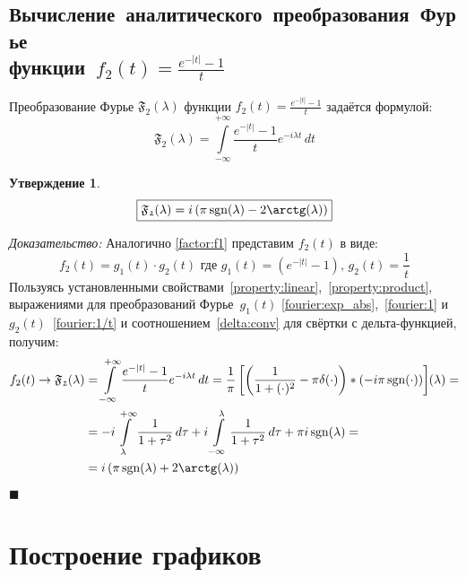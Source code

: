 \documentclass[11pt, oneside, final]{article}
\numberwithin{equation}{section}
\newtheorem*{statement}{Утверждение}
\renewenvironment{proof}{
\noindent\textit{Доказательство: }} {\qed}
\newcommand \rarrow{\rightarrow}
\newcommand \intinf[1][{\,dt}]{ \int\limits_{-\infty}^{+\infty}{{#1}}}
\renewcommand \qed{$\blacksquare$}
\DeclareMathOperator{\sgn}{sgn}
\begin{document}
    \subsection{Вычисление~аналитического~преобразования~Фурье\\функции~\(f_2(t) = \frac{e^{-|t|} - 1}{t} \)}
    Преобразование Фурье \( \mathfrak{F_2} (\lambda)\) функции \(f_2(t) = \frac{e^{-|t|} - 1}{t} \) задаётся формулой:
    \[ \mathfrak{F_2} (\lambda) = \intinf[{\dfrac{e^{-|t|} - 1}{t} e^{-i\lambda t}\, dt}] \]
    \begin{statement}
        \begin{equation}\label{eq:fourier:f2} 
            \boxed{ \mathfrak{F_2}(\lambda) = i\left(\pi\sgn(\lambda) - 2\arctg(\lambda)\right) } 
        \end{equation}
    \end{statement}
    \begin{proof}
        Аналогично \eqref{factor:f1} представим \(f_2(t) \) в виде: 
        \begin{equation}\label{factor:f2} 
            f_2(t) = g_1(t) \cdot g_2(t) \text{ где } g_1(t) = \left(e^{-|t|} - 1\right)\text{, } g_2(t) = \dfrac{1}{t} 
        \end{equation}
        Пользуясь установленными свойствами~\ref{property:linear},~\ref{property:product}, выражениями для преобразований Фурье~\(g_1(t)\) \eqref{fourier:exp_abs},~\eqref{fourier:1} и~\(g_2(t)\)~\eqref{fourier:1/t} и соотношением~\eqref{delta:conv} для свёртки с дельта-функцией, получим:
        \[ 
        \begin{split} 
            f_2(t) \rarrow \mathfrak{F_2} (\lambda) &= \intinf[{ \dfrac{e^{-|t|} - 1}{t} e^{-i\lambda t}\, dt}] = \dfrac{1}{\pi}\left[\left({\dfrac{1}{1 + (\cdot)^2} - \pi\delta(\cdot)}\right) * \left({-i \pi \sgn(\cdot)}\right)\right] \negmedspace({\lambda}) = \\
            &= -i\int\limits_{\lambda}^{+\infty}{\dfrac{1}{1 + \tau^2}\, d\tau} + i\int\limits_{-\infty}^{\lambda}{\dfrac{1}{1 + \tau^2}\, d\tau} + \pi i \sgn(\lambda) = \\
            &= i\left(\pi \sgn(\lambda) + 2\arctg(\lambda)\right) 
        \end{split}
        \]
    \end{proof}
    \clearpage
    \section{Построение графиков} %
    \label{sec:plotting}
\end{document}
